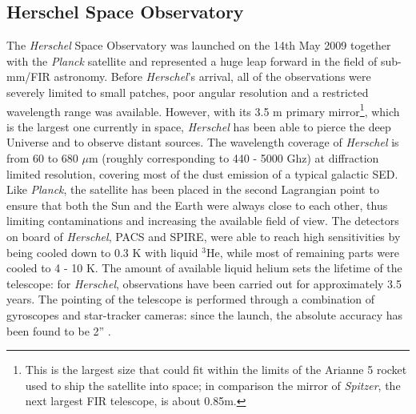 \subsection{Herschel Space Observatory}
\label{sec:HSO}
The \textit{Herschel} Space Observatory \citep{Pilbratt2010} was launched on the 14th May 2009 together with the \textit{Planck} satellite and represented a huge leap forward in the field of sub-mm/\gls{FIR} astronomy. Before \textit{Herschel}'s arrival, all of the observations were severely limited to small patches, poor angular resolution and a restricted wavelength range was available. However, with its 3.5 m primary mirror\footnote{This is the largest size that could fit within the limits of the Arianne 5 rocket used to ship the satellite into space; in comparison the mirror of \textit{Spitzer}, the next largest \gls{FIR} telescope, is about 0.85m.}, which is the largest one currently in space, \textit{Herschel} has been able to pierce the deep Universe and to observe distant sources. The wavelength coverage of \textit{Herschel} is from 60 to 680 $\mu$m (roughly corresponding to 440 - 5000 Ghz) at diffraction limited resolution, covering most of the dust emission of a typical galactic \gls{SED}. Like \textit{Planck}, the satellite has been placed in the second Lagrangian point to ensure that both the Sun and the Earth were always close to each other, thus limiting contaminations and increasing the available field of view. The detectors on board of \textit{Herschel}, PACS and SPIRE, were able to reach high sensitivities by being cooled down to 0.3 K with liquid ${}^3$He, while most of remaining parts were cooled to 4 - 10 K. The amount of available liquid helium sets the lifetime of the telescope: for \textit{Herschel}, observations have been carried out for approximately 3.5 years. The pointing of the telescope is performed through a combination of gyroscopes and star-tracker cameras: since the launch, the absolute accuracy has been found to be 2'' \citep{Pilbratt2010}.

